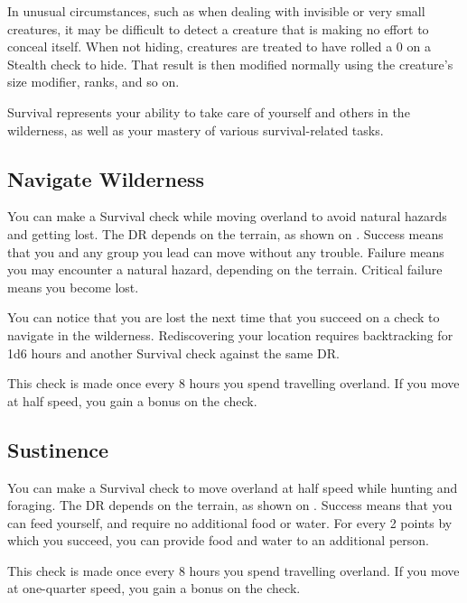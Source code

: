          In unusual circumstances, such as when dealing with invisible or very small creatures, it may be difficult to detect a creature that is making no effort to conceal itself. When not hiding, creatures are treated to have rolled a 0 on a Stealth check to hide. That result is then modified normally using the creature's size modifier, ranks, and so on.

        Survival represents your ability to take care of yourself and others in the wilderness, as well as your mastery of various survival-related tasks.

    \subsection{Navigate Wilderness}
        You can make a Survival check while moving overland to avoid natural hazards and getting lost. The DR depends on the terrain, as shown on . Success means that you and any group you lead can move without any trouble. Failure means you may encounter a natural hazard, depending on the terrain. Critical failure means you become lost.

        You can notice that you are lost the next time that you succeed on a check to navigate in the wilderness. Rediscovering your location requires backtracking for 1d6 hours and another Survival check against the same DR.

        This check is made once every 8 hours you spend travelling overland. If you move at half speed, you gain a  bonus on the check.

    \subsection{Sustinence}
        You can make a Survival check to move overland at half speed while hunting and foraging. The DR depends on the terrain, as shown on . Success means that you can feed yourself, and require no additional food or water. For every 2 points by which you succeed, you can provide food and water to an additional person.

        This check is made once every 8 hours you spend travelling overland. If you move at one-quarter speed, you gain a  bonus on the check.

